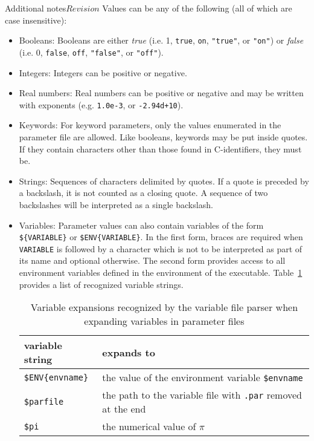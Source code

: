 \begin{cactuspart}{Additional notes}{}{$Revision$}
Values can be any of the following (all of which are case insensitive):
\begin{itemize}
\item Booleans: Booleans are either \textit{true} (i.e. 1, \verb=true=, \verb=on=,
\verb="true"=, or \verb="on"=) or \textit{false}
(i.e. 0, \verb=false=, \verb=off=, \verb="false"=, or \verb="off"=).
\item Integers: Integers can be positive or negative.
\item Real numbers: Real numbers can be positive or negative and may be written
 with exponents (e.g. \verb=1.0e-3=, or \verb=-2.94d+10=).
\item Keywords: For keyword parameters, only the values enumerated in the parameter
file are allowed. Like booleans, keywords may be put inside quotes. If they contain
characters other than those found in C-identifiers, they must be.
\item Strings: Sequences of characters delimited by quotes. If a quote is preceded by
a backslash, it is not counted as a closing quote. A sequence of two backslashes will
be interpreted as a single backslash.
\item Variables:
Parameter values can also contain variables of the form
\verb|${VARIABLE}| or \verb|$ENV{VARIABLE}|. In the first form, braces are
required when \verb|VARIABLE| is followed by a character which is not to
be interpreted as part of its name and optional otherwise. The second
form provides access to all environment variables defined in the
environment of the executable.  Table~\ref{tab:variable-expansions}
provides a list of recognized variable strings.
\begin{table}[htbp]
\begin{tabular}{|ll|}
    \hline
    variable string & expands to\\
    \hline
    \verb|$ENV{envname}| &
    the value of the environment variable \verb|$envname|\\
    \verb|$parfile| &
    the path to the variable file with \verb|.par| removed at the
    end \\
    \verb|$pi| & the numerical value of $\pi$ \\
    \hline
\end{tabular}
\caption{Variable expansions recognized by the variable file parser when
expanding variables in parameter files}\label{tab:variable-expansions}
\end{table}


\end{itemize}
\end{cactuspart}
